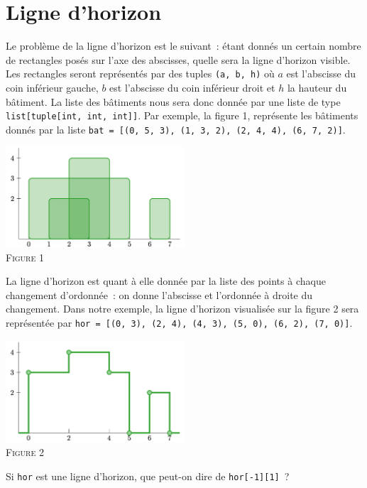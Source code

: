 \documentclass{magnolia}
\begin{document}


\section{Ligne d'horizon}

Le problème de la ligne d'horizon est le suivant~: étant donnés un certain nombre de rectangles posés sur
l'axe des abscisses, quelle sera la ligne d'horizon visible. Les rectangles seront représentés par des
tuples \verb!(a, b, h)! où $a$ est l'abscisse du coin inférieur gauche, $b$ est l'abscisse du coin
inférieur droit et $h$ la hauteur du bâtiment. La liste des bâtiments nous sera donc donnée par une
liste de type \verb!list[tuple[int, int, int]]!. Par exemple, la figure 1, représente les bâtiments donnés
par la liste \verb!bat = [(0, 5, 3), (1, 3, 2), (2, 4, 4), (6, 7, 2)]!.
\begin{center}
\includegraphics[width=0.5\textwidth]{../../Commun/Images/python-tp-horizon-1}\\
\textsc{Figure 1}
\end{center}
La ligne d'horizon est quant à elle donnée par la liste des points à chaque changement d'ordonnée~: on donne
l'abscisse et l'ordonnée à droite du changement. Dans notre exemple, la ligne d'horizon visualisée sur
la figure 2 sera représentée par \verb!hor = [(0, 3), (2, 4), (4, 3), (5, 0), (6, 2), (7, 0)]!.
\begin{center}
\includegraphics[width=0.5\textwidth]{../../Commun/Images/python-tp-horizon-2}\\
\textsc{Figure 2}
\end{center}
\begin{questions}
\question Si \verb!hor! est une ligne d'horizon, que peut-on dire de \verb!hor[-1][1]!~?
\end{questions}
\end{document}
